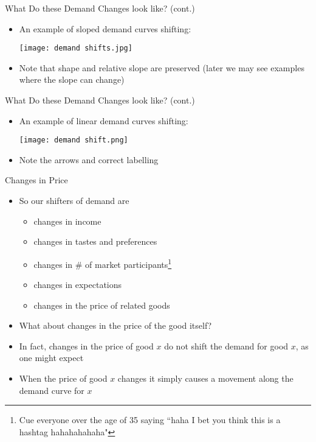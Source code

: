 \documentclass[10pt,xcolor={svgnames}]{beamer}
\begin{document}
\begin{frame}{What Do these Demand Changes look like? (cont.)}
    \begin{itemize}
        \item An example of sloped demand curves shifting:
        \begin{center}
            \texttt{[image: demand shifts.jpg]}
        \end{center}
        \item Note that shape and relative slope are preserved (later we may see examples where the slope can change)
    \end{itemize}
\end{frame}


\begin{frame}{What Do these Demand Changes look like? (cont.)}
    \begin{itemize}
        \item An example of linear demand curves shifting:
        \begin{center}
            \texttt{[image: demand shift.png]}
        \end{center}
        \item Note the arrows and correct labelling 
    \end{itemize}
\end{frame}


\begin{frame}{Changes in Price}
    \begin{itemize}
        \item So our shifters of demand are
        \begin{itemize}
            \item changes in income
            \item changes in tastes and preferences
            \item changes in \# of market participants\footnote{\vspace{1.5mm}Cue everyone over the age of 35 saying ``haha I bet you think this is a hashtag hahahahahaha"}
            \item changes in expectations
            \item changes in the price of related goods
        \end{itemize}
        \item<2-> What about changes in the price of the good itself?
        \item<3-> In fact, changes in the price of good $x$ do not shift the demand for good $x$, as one might expect
        \item<4-> When the price of good $x$ changes it simply causes a movement along the demand curve for $x$
    \end{itemize}
\end{frame}
\end{document}
